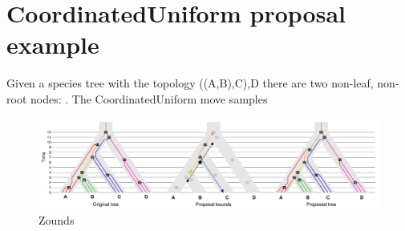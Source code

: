 \documentclass[12pt]{article}
\begin{document}
\section{CoordinatedUniform proposal example}

Given a species tree with the topology ((A,B),C),D there are two non-leaf, non-root
nodes: . The CoordinatedUniform move samples 

\begin{figure}[htb!]
\centering
\includegraphics[width=\textwidth]{coordinated_uniform.pdf}
\caption
{Zounds}
\label{fig:cuni}
\end{figure}
\end{document}
